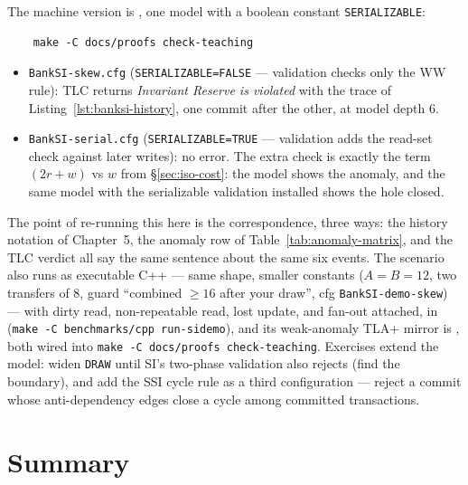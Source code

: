 The machine version is , one model with a boolean
constant \texttt{SERIALIZABLE}:

\begin{verbatim}
    make -C docs/proofs check-teaching
\end{verbatim}

\begin{itemize}
\item \texttt{BankSI-skew.cfg} (\texttt{SERIALIZABLE=FALSE} --- validation
checks only the WW rule): TLC returns \emph{Invariant Reserve is violated}
with the trace of Listing~\ref{lst:banksi-history}, one commit after the
other, at model depth 6.
\item \texttt{BankSI-serial.cfg} (\texttt{SERIALIZABLE=TRUE} --- validation
adds the read-set check against later writes): no error. The extra check is
exactly the term $(2r+w)$ vs $w$ from \S\ref{sec:iso-cost}: the model shows
the anomaly, and the same model with the serializable validation installed
shows the hole closed.
\end{itemize}

The point of re-running this here is the correspondence, three ways: the
history notation of Chapter~5, the anomaly row of Table~\ref{tab:anomaly-matrix},
and the TLC verdict all say the same sentence about the same six events.
The scenario also runs as executable C++ --- same shape, smaller constants
($A = B = 12$, two transfers of 8, guard ``combined $\geq 16$ after your
draw'', cfg \texttt{BankSI-demo-skew}) --- with dirty read, non-repeatable
read, lost update, and fan-out attached, in
(\texttt{make -C benchmarks/cpp run-sidemo}), and its weak-anomaly TLA+
mirror is , both wired into
\texttt{make -C docs/proofs check-teaching}.
Exercises extend the model: widen \texttt{DRAW} until SI's two-phase
validation also rejects (find the boundary), and add the SSI cycle rule as a
third configuration --- reject a commit whose anti-dependency edges close a
cycle among committed transactions.

\section{Summary}

